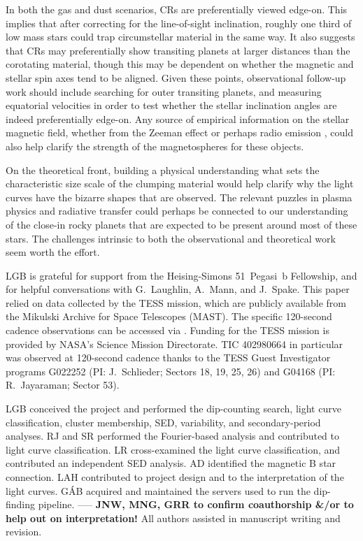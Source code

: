 \documentclass[11pt,twocolumn,tighten]{aastex63}
\begin{document}
In both the gas and dust scenarios, CRs are preferentially viewed
edge-on.  This implies that after correcting for the line-of-sight
inclination, roughly one third of low mass stars \citep[those that
rotate rapidly enough;][]{2022AJ....163..144G} could trap circumstellar
material in the same way.  It also suggests that CRs may
preferentially show transiting planets at larger distances than the
corotating material, though this may be dependent on whether the
magnetic and stellar spin axes tend to be aligned.  Given these
points, observational follow-up work should include searching for
outer transiting planets, and measuring equatorial velocities in order
to test whether the stellar inclination angles are indeed
preferentially edge-on.  Any source of empirical information on the
stellar magnetic field, whether from the Zeeman effect
\citep[e.g.][]{2021A&ARv..29....1K} or perhaps radio emission
\citep[e.g.][]{2015Natur.523..568H}, could also help clarify the
strength of the magnetospheres for these objects.

On the theoretical front, building a physical understanding what sets
the characteristic size scale of the clumping material would help
clarify why the light curves have the bizarre shapes that are
observed.  The relevant puzzles in plasma physics and radiative
transfer could perhaps be connected to our understanding of the
close-in rocky planets that are expected to be present around most of
these stars.  The challenges intrinsic to both the observational and
theoretical work seem worth the effort.



\acknowledgments
LGB is grateful for support from the Heising-Simons 51~Pegasi~b
Fellowship, and for helpful conversations with G.~Laughlin, A.~Mann,
and J.~Spake.  This paper relied on data collected by the TESS
mission, which are publicly available from the Mikulski Archive for
Space Telescopes (MAST).  The specific 120-second cadence observations
can be accessed via
.  Funding for the
TESS mission is provided by NASA’s Science Mission Directorate.  TIC
402980664 in particular was observed at 120-second cadence thanks to
the TESS Guest Investigator programs G022252 (PI: J.~Schlieder;
Sectors 18, 19, 25, 26) and G04168 (PI: R.~Jayaraman; Sector 53).


LGB conceived the project and performed the dip-counting search, light curve classification, cluster membership, SED, variability, and secondary-period analyses.
RJ and SR performed the Fourier-based analysis and contributed to light curve classification.
LR cross-examined the light curve classification, and contributed an independent SED analysis.
AD identified the magnetic B star connection.
LAH contributed to project design and to the interpretation of the light curves.
G\'AB acquired and maintained the servers used to run the dip-finding pipeline.
-----
{\bf JNW, MNG, GRR to confirm coauthorship \&/or to help out on interpretation!}
All authors assisted in manuscript writing and revision.
\end{document}
